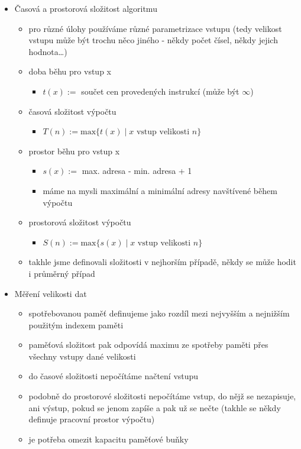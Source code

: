 \begin{itemize}
\item Časová a prostorová složitost algoritmu
\begin{itemize}
\item pro různé úlohy používáme různé parametrizace vstupu (tedy velikost vstupu může být trochu něco jiného - někdy počet čísel, někdy jejich hodnota\dots{})
\item doba běhu pro vstup x
\begin{itemize}
\item $t(x):=$ součet cen provedených instrukcí (může být $\infty$)
\end{itemize}
\item časová složitost výpočtu
\begin{itemize}
\item $T(n):= \text{max}\lbrace t(x)\mid x \text{ vstup velikosti }n\rbrace$
\end{itemize}
\item prostor běhu pro vstup x
\begin{itemize}
\item $s(x):=$ max. adresa - min. adresa + 1
\item máme na mysli maximální a minimální adresy navštívené během výpočtu
\end{itemize}
\item prostorová složitost výpočtu
\begin{itemize}
\item $S(n):= \text{max}\lbrace s(x)\mid x \text{ vstup velikosti }n\rbrace$
\end{itemize}
\item takhle jsme definovali složitosti v nejhorším případě, někdy se může hodit i průměrný případ
\end{itemize}
\item Měření velikosti dat
\begin{itemize}
\item spotřebovanou paměť definujeme jako rozdíl mezi nejvyšším a nejnižším použitým indexem paměti
\item paměťová složitost pak odpovídá maximu ze spotřeby paměti přes všechny vstupy dané velikosti
\item do časové složitosti nepočítáme načtení vstupu
\item podobně do prostorové složitosti nepočítáme vstup, do nějž se nezapisuje, ani výstup, pokud se jenom zapíše a pak už se nečte (takhle se někdy definuje pracovní prostor výpočtu)
\item je potřeba omezit kapacitu paměťové buňky

\end{itemize}
\end{itemize}
